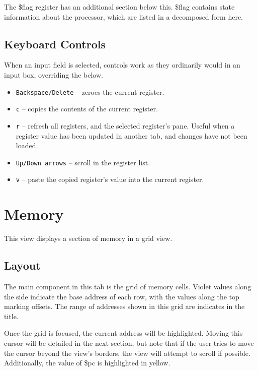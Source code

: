 \documentclass[10pt]{article}
\begin{document}
    The \$flag register has an additional section below this.
    \$flag contains state information about the processor, which are listed in a decomposed form here.

    \subsection{Keyboard Controls}

    When an input field is selected, controls work as they ordinarily would in an input box, overriding the below.

    \begin{itemize}
        \item \texttt{Backspace/Delete} -- zeroes the current register.
        \item \texttt{c} -- copies the contents of the current register.
        \item \texttt{r} -- refresh all registers, and the selected register's pane.
        Useful when a register value has been updated in another tab, and changes have not been loaded.
        \item \texttt{Up/Down arrows} -- scroll in the register list.
        \item \texttt{v} -- paste the copied register's value into the current register.
    \end{itemize}

    \section{Memory}

    This view displays a section of memory in a grid view.

    \subsection{Layout}

    The main component in this tab is the grid of memory cells.
    Violet values along the side indicate the base address of each row, with the values along the top marking offsets.
    The range of addresses shown in this grid are indicates in the title.

    Once the grid is focused, the current address will be highlighted.
    Moving this cursor will be detailed in the next section, but note that if the user tries to move the cursor beyond the view's borders, the view will attempt to scroll if possible.
    Additionally, the value of \$pc is highlighted in yellow.
\end{document}
